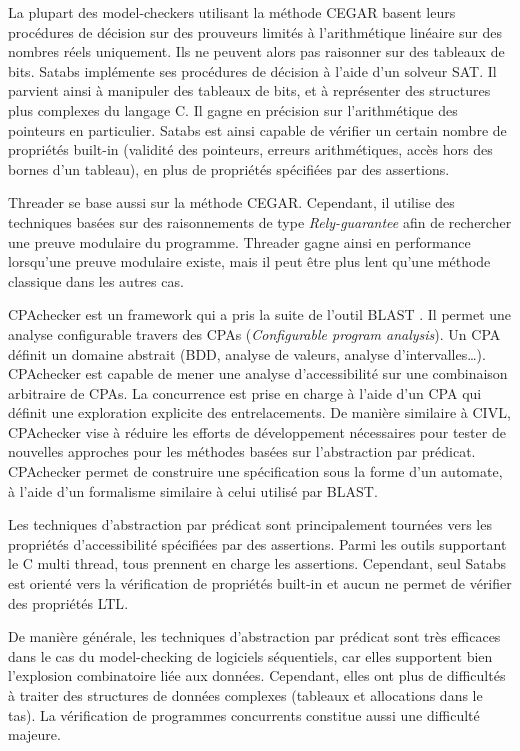 La plupart des model-checkers utilisant la méthode \ac{CEGAR} basent leurs procédures
de décision sur des prouveurs limités à l'arithmétique linéaire sur des nombres
réels uniquement. Ils ne peuvent alors pas raisonner sur des tableaux de bits.
Satabs\cite{Satabs}\cite{clarkesatabs} implémente ses procédures de décision à
l'aide d'un solveur SAT. Il parvient ainsi à manipuler des tableaux de bits, et
à représenter des structures plus complexes du langage C. Il gagne en précision
sur l'arithmétique des pointeurs en particulier. Satabs est ainsi capable de
vérifier un certain nombre de propriétés built-in (validité des pointeurs,
erreurs arithmétiques, accès hors des bornes d'un tableau), en plus de
propriétés spécifiées par des assertions.

Threader\cite{Threader}\cite{Threader_theory} se base aussi sur la méthode
\ac{CEGAR}. Cependant, il utilise des techniques basées sur des raisonnements de type
\emph{Rely-guarantee} afin de rechercher une preuve modulaire du programme.
Threader gagne ainsi en performance lorsqu'une preuve modulaire existe, mais
il peut être plus lent qu'une méthode classique dans les autres cas.

CPAchecker\cite{CPAChecker} est un framework qui a pris la suite de l'outil
BLAST \cite{BLAST}. Il permet une analyse configurable travers des CPAs
(\emph{Configurable program analysis}). Un CPA définit un domaine abstrait
(\ac{BDD}, analyse de valeurs, analyse d'intervalles\dots). CPAchecker est capable
de mener une analyse d'accessibilité sur une combinaison arbitraire de CPAs. La
concurrence est prise en charge à l'aide d'un CPA qui définit une exploration
explicite des entrelacements\cite{CPAChecker_multithread}. De manière similaire
à CIVL, CPAchecker vise à réduire les efforts de développement nécessaires pour
tester de nouvelles approches pour les méthodes basées sur l'abstraction par
prédicat. CPAchecker permet de construire une spécification sous la forme d'un
automate, à l'aide d'un formalisme similaire à celui utilisé par BLAST.

Les techniques d'abstraction par prédicat sont principalement tournées vers les
propriétés d'accessibilité spécifiées par des assertions. Parmi les outils
supportant le C multi thread, tous prennent en charge les assertions. Cependant, seul
Satabs est orienté vers la vérification de propriétés built-in et aucun ne
permet de vérifier des propriétés \ac{LTL}.

De manière générale, les techniques d'abstraction par prédicat sont très
efficaces dans le cas du model-checking de logiciels séquentiels, car elles
supportent bien l'explosion combinatoire liée aux données. Cependant, elles ont
plus de difficultés à traiter des structures de données complexes (tableaux et
allocations dans le tas). La vérification de programmes concurrents constitue
aussi une difficulté majeure.

